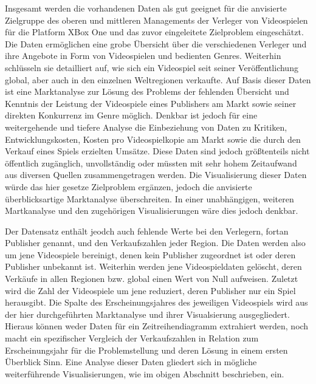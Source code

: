 \documentclass[usegeometry=true]{scrartcl}
\begin{document}
Insgesamt werden die vorhandenen Daten als gut geeignet für die anvisierte Zielgruppe des oberen und mittleren Managements der Verleger von Videospielen für die Platform XBox One und das zuvor eingeleitete Zielproblem eingeschätzt. 
Die Daten ermöglichen eine grobe Übersicht über die verschiedenen Verleger und ihre Angebote in Form von Videospielen und bedienten Genres. 
Weiterhin schlüsseln sie detailliert auf, wie sich ein Videospiel seit seiner Veröffentlichung global, aber auch in den einzelnen Weltregionen verkaufte. 
Auf Basis dieser Daten ist eine Marktanalyse zur Lösung des Problems der fehlenden Übersicht und Kenntnis der Leistung der Videospiele eines Publishers am Markt sowie seiner direkten Konkurrenz im Genre möglich. 
Denkbar ist jedoch für eine weitergehende und tiefere Analyse die Einbeziehung von Daten zu Kritiken, Entwicklungskosten, Kosten pro Videospielkopie am Markt sowie die durch den Verkauf eines Spiels erzielten Umsätze. 
Diese Daten sind jedoch größtenteils nicht öffentlich zugänglich, unvollständig oder müssten mit sehr hohem Zeitaufwand aus diversen Quellen zusammengetragen werden. 
Die Visualisierung dieser Daten würde das hier gesetze Zielproblem ergänzen, jedoch die anvisierte überblicksartige Marktanalyse überschreiten. 
In einer unabhängigen, weiteren Martkanalyse und den zugehörigen Visualisierungen wäre dies jedoch denkbar.    

Der Datensatz enthält jeodch auch fehlende Werte bei den Verlegern, fortan Publisher genannt, und den Verkaufszahlen jeder Region. 
Die Daten werden also um jene Videospiele bereinigt, denen kein Publisher zugeordnet ist oder deren Publisher unbekannt ist. 
Weiterhin werden jene Videospieldaten gelöscht, deren Verkäufe in allen Regionen bzw. global einen Wert von Null aufweisen. 
Zuletzt wird die Zahl der Videospiele um jene reduziert, deren Publisher nur ein Spiel herausgibt.  
Die Spalte des Erscheinungsjahres des jeweiligen Videospiels wird aus der hier durchgeführten Marktanalyse und ihrer Visualsierung ausgegliedert. 
Hieraus können weder Daten für ein Zeitreihendiagramm extrahiert werden, noch macht ein spezifischer Vergleich der Verkaufszahlen in Relation zum Erscheinungsjahr für die Problemstellung und deren Lösung in einem ersten Überblick Sinn. Eine Analyse dieser Daten gliedert sich in mögliche weiterführende Visualisierungen, wie im obigen Abschnitt beschrieben, ein. 
\end{document}
